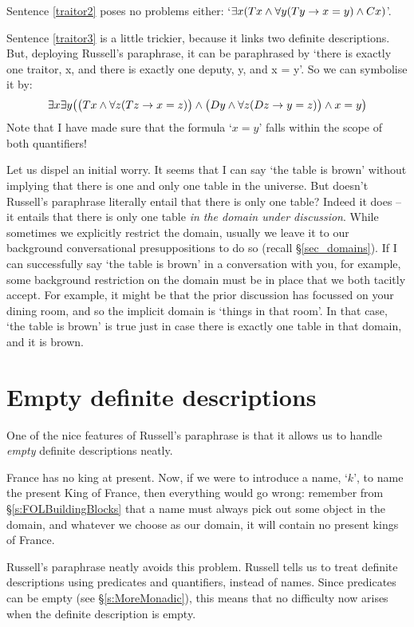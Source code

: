 Sentence \ref{traitor2} poses no problems either: `$\exists x (Tx \wedge \forall y(Ty \rightarrow x = y) \wedge Cx)$'.

Sentence \ref{traitor3} is a little trickier, because it links two definite descriptions. But, deploying  Russell's paraphrase, it can be paraphrased by `there is exactly one traitor, x, and there is exactly one deputy, y, and x = y'. So we can symbolise it by: 
$$\exists x \exists y \bigl(\bigl(Tx \wedge \forall z(Tz \rightarrow x = z) \bigr) \wedge \bigl(Dy \wedge \forall z(Dz \rightarrow y = z) \bigr) \wedge x = y\bigr)$$
Note that I have made sure that the formula `$x = y$' falls within the scope of both quantifiers!

Let us dispel an initial worry. It seems that I can say `the table is brown' without implying that there is one and only one table in the universe. But doesn't Russell's paraphrase literally entail that there is only one table? Indeed it does – it entails that there is only one table \emph{in the domain under discussion}. While sometimes we explicitly restrict the domain, usually we leave it to our background conversational presuppositions to do so (recall §\ref{sec_domains}). If I can successfully say `the table is brown' in a conversation with you, for example, some background restriction on the domain must be in place that we both tacitly accept. For example, it might be that the prior discussion has focussed on your dining room, and so the implicit domain is `things in that room'. In that case, `the table is brown' is true just in case there is exactly one table in that domain, and it is brown.


\section{Empty definite descriptions}
One of the nice features of Russell's paraphrase is that it allows us to handle \emph{empty} definite descriptions neatly. 

France has no king at present. Now, if we were to introduce a name, `$k$', to name the present King of France, then everything would go wrong: remember from §\ref{s:FOLBuildingBlocks} that a name must always pick out  some object in the domain, and whatever we choose as our domain, it will contain no present kings of France. 

Russell's paraphrase neatly avoids this problem. Russell tells us to treat definite descriptions using predicates and quantifiers, instead of names. Since predicates can be empty (see §\ref{s:MoreMonadic}), this means that no difficulty now arises when the definite description is empty. 


